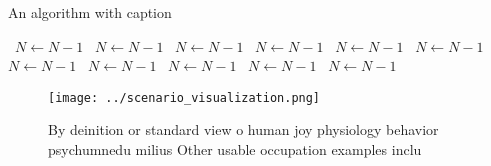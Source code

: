 \documentclass[a4paper]{article}
\begin{document}
\begin{algorithm}
\caption{An algorithm with caption}
\begin{algorithmic}
\    \State $N \gets N - 1$
\    \State $N \gets N - 1$
\    \State $N \gets N - 1$
\    \State $N \gets N - 1$
\    \State $N \gets N - 1$
\    \State $N \gets N - 1$
\    \State $N \gets N - 1$
\    \State $N \gets N - 1$
\    \State $N \gets N - 1$
\    \State $N \gets N - 1$
\    \State $N \gets N - 1$
\EndWhile
\end{algorithmic}
\end{algorithm}

\begin{figure}
\centering
\texttt{[image: ../scenario\_visualization.png]}
\caption{By deinition or standard view o human joy physiology behavior psychumnedu milius Other usable occupation examples inclu
}
\end{figure}
 
\end{document}
